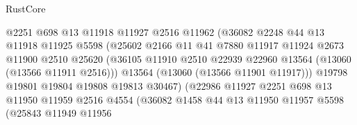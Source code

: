 \begin{lexlean}{RustCore}
\begin{coremodule}
                                  @2251
                                  @698
                                  @13
                                  @11918
                                  @11927
                                  @2516
                                  @11962
                                  (@36082
                                    @2248
                                    @44
                                    @13
                                    @11918
                                    @11925
                                    @5598
                                    (@25602
                                      @2166
                                      @11
                                      @41
                                      @7880
                                      @11917
                                      @11924
                                      @2673
                                      @11900
                                      @2510
                                      @25620
                                      (@36105
                                        @11910
                                        @2510
                                        @22939
                                        @22960
                                        @13564
                                        (@13060 (@13566 @11911 @2516)))
                                      @13564
                                      (@13060 (@13566 @11901 @11917)))
                                    @19798
                                    @19801
                                    @19804
                                    @19808
                                    @19813
                                    @30467)
                                  (@22986
                                    @11927
                                    @2251
                                    @698
                                    @13
                                    @11950
                                    @11959
                                    @2516
                                    @4554
                                    (@36082
                                      @1458
                                      @44
                                      @13
                                      @11950
                                      @11957
                                      @5598
                                      (@25843
                                        @11949
                                        @11956

\end{coremodule}
\end{lexlean}
